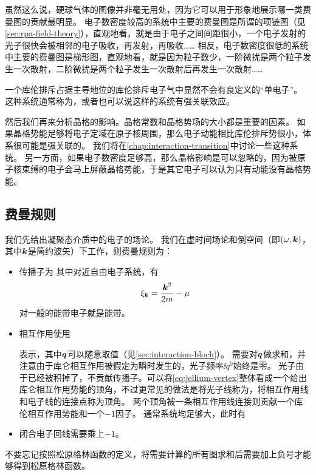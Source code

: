 虽然这么说，硬球气体的图像并非毫无用处，因为它可以用于形象地展示哪一类费曼图的贡献最明显。
电子数密度较高的系统中主要的费曼图是所谓的项链图（见\autoref{sec:rpa-field-theory}），直观地看，就是由于电子之间间距很小，一个电子发射的光子很快会被相邻的电子吸收，再发射，再吸收……
相反，电子数密度很低的系统中主要的费曼图是梯形图，直观地看，就是因为粒子数少，一阶微扰是两个粒子发生一次散射，二阶微扰是两个粒子发生一次散射后再发生一次散射……

一个库伦排斥占据主导地位的库伦排斥电子气中显然不会有良定义的“单电子”。
这种系统通常称为，或者也可以说这样的系统有强关联效应。

然后我们再来分析晶格的影响。晶格常数和晶格势场的大小都是重要的因素。
如果晶格势能足够将电子定域在原子核周围，那么电子动能相比库伦排斥势很小，体系很可能是强关联的。
我们将在\autoref{chap:interaction-transition}中讨论一些这种系统。
另一方面，如果电子数密度足够高，那么晶格影响是可以忽略的，因为被原子核束缚的电子会马上屏蔽晶格势能，于是其它电子可以认为只有动能没有晶格势能。

\subsection{费曼规则}

我们先给出凝聚态介质中的电子的场论。
我们在虚时间场论和倒空间（即$(\omega, \vb*{k})$，其中$\vb*{k}$是简约波矢）下工作，则费曼规则为：
\begin{itemize}
    \item 传播子为
    其中对近自由电子系统，有
    \begin{equation}
        \xi_{\vb*{k}} = \frac{\vb*{k}^2}{2m} - \mu
    \end{equation}
    对一般的能带电子就是能带。
    \item 相互作用使用
    
    表示，其中$\vb*{q}$可以随意取值（见\autoref{sec:interaction-bloch}）。
    需要对$\vb*{q}$做求和，并注意由于库仑相互作用被假定为瞬时发生的，光子频率$\ii q^0$始终是零。
    光子由于已经被积掉了，不贡献传播子。可以将\eqref{eq:jellium-vertex}整体看成一个给出库仑相互作用势能的顶角，不过更常见的做法是将光子线称为，将相互作用线和电子线的连接点称为顶角。
    两个顶角被一条相互作用线连接则贡献一个库伦相互作用势能和一个$-1$因子。
    通常系统均足够大，此时有
    \item 闭合电子回线需要乘上$-1$。
\end{itemize}
不要忘记按照松原格林函数的定义，将需要计算的所有图求和后需要加上负号才能够得到松原格林函数。

